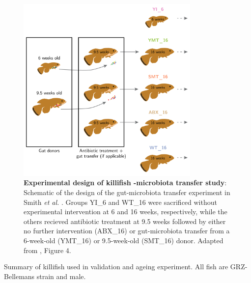 \begin{figure}
\centering
\includegraphics[width = 0.8\textwidth]{_Figures/png_edited/gut-design}
\caption[Experimental design of killifish gut-microbiota transfer study]{\textbf{Experimental design of killifish \gut-microbiota transfer study}: Schematic of the design of the gut-microbiota transfer experiment in Smith \textit{et al.} \parencite{smith2017microbiota}. Groups YI\_6 and WT\_16 were sacrificed without experimental intervention at 6 and 16 weeks, respectively, while the others recieved antibiotic treatment at 9.5 weeks followed by either no further intervention (ABX\_16) or gut-microbiota transfer from a 6-week-old (YMT\_16) or 9.5-week-old (SMT\_16) donor. Adapted from \parencite{smith2017microbiota}, Figure 4.}
\label{fig:igseq-gut-design}
\end{figure}

\begin{table}[b]
\centering

\caption{Summary of killifish used in \igseq validation and ageing experiment. All fish are GRZ-Bellemans strain and male.}
\label{tab:gut-cohorts-summary}
\end{table}

